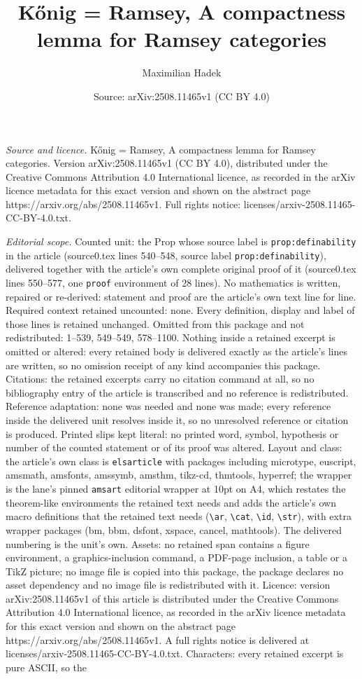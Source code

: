 \documentclass[10pt,a4paper]{amsart}
\title[K\H{o}nig = Ramsey, A compactness lemma for Ramsey categorie]{K\H{o}nig = Ramsey, A compactness lemma for Ramsey categories}
\author{Maximilian Hadek}
\date{Source: arXiv:2508.11465v1 (CC BY 4.0)}
\begin{document}
\maketitle

\noindent\emph{Source and licence.} K\H{o}nig = Ramsey, A compactness lemma for Ramsey categories. Version arXiv:2508.11465v1 (CC BY 4.0), distributed under the Creative Commons Attribution 4.0 International licence, as recorded in the arXiv licence metadata for this exact version and shown on the abstract page https://arxiv.org/abs/2508.11465v1. Full rights notice: licenses/arxiv-2508.11465-CC-BY-4.0.txt.\par\smallskip

\noindent\textit{Editorial scope.} Counted unit: the Prop whose source label is \texttt{prop:definability} in the article (source0.tex lines 540--548, source label \texttt{prop:definability}), delivered together with the article's own complete original proof of it (source0.tex lines 550--577, one \texttt{proof} environment of 28 lines). No mathematics is written, repaired or re-derived: statement and proof are the article's own text line for line. Required context retained uncounted: none. Every definition, display and label of those lines is retained unchanged. Omitted from this package and not redistributed: 1--539, 549--549, 578--1100. Nothing inside a retained excerpt is omitted or altered: every retained body is delivered exactly as the article's lines are written, so no omission receipt of any kind accompanies this package. Citations: the retained excerpts carry no citation command at all, so no bibliography entry of the article is transcribed and no reference is redistributed. Reference adaptation: none was needed and none was made; every reference inside the delivered unit resolves inside it, so no unresolved reference or citation is produced. Printed slips kept literal: no printed word, symbol, hypothesis or number of the counted statement or of its proof was altered. Layout and class: the article's own class is \texttt{elsarticle} with packages including microtype, euscript, amsmath, amsfonts, amssymb, amsthm, tikz-cd, thmtools, hyperref; the wrapper is the lane's pinned \texttt{amsart} editorial wrapper at 10pt on A4, which restates the theorem-like environments the retained text needs and adds the article's own macro definitions that the retained text needs (\texttt{\textbackslash ar}, \texttt{\textbackslash cat}, \texttt{\textbackslash id}, \texttt{\textbackslash str}), with extra wrapper packages (bm, bbm, dsfont, xspace, cancel, mathtools). The delivered numbering is the unit's own. Assets: no retained span contains a figure environment, a graphics-inclusion command, a PDF-page inclusion, a table or a TikZ picture; no image file is copied into this package, the package declares no asset dependency and no image file is redistributed with it. Licence: version arXiv:2508.11465v1 of this article is distributed under the Creative Commons Attribution 4.0 International licence, as recorded in the arXiv licence metadata for this exact version and shown on the abstract page https://arxiv.org/abs/2508.11465v1. A full rights notice is delivered at licenses/arxiv-2508.11465-CC-BY-4.0.txt. Characters: every retained excerpt is pure ASCII, so the 
\end{document}
